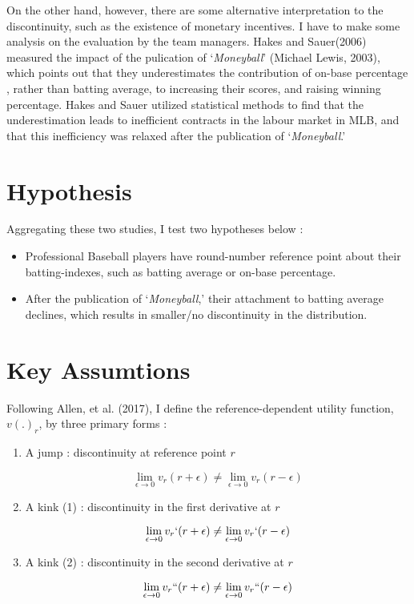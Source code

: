 \documentclass{jsarticle}[12pt]
\begin{document}
\hspace{1zw}On the other hand, however, there are some alternative interpretation to the discontinuity, such as the existence of monetary incentives. I have to make some analysis on the evaluation by the team managers. Hakes and Sauer(2006) measured the impact of the pulication of `\textit{Moneyball}' (Michael Lewis, 2003), which points out that they underestimates the contribution of on-base percentage , rather than batting average, to increasing their scores, and raising winning percentage.  Hakes and Sauer utilized statistical methods to find that the underestimation leads to inefficient contracts in the labour market in MLB, and that this inefficiency was relaxed after the publication of `\textit{Moneyball}.'

\section{Hypothesis}

\hspace{1zw}Aggregating these two studies, I test two hypotheses below :

 \begin{itemize}
 
 \item Professional Baseball players have round-number reference point about their batting-indexes, such as batting average or on-base percentage.
 
 \item After the publication of `\textit{Moneyball},' their attachment to batting average declines, which results in smaller/no discontinuity in the distribution.
 
 \end{itemize}

\section{Key Assumtions}

\hspace{1zw} Following Allen, et al. (2017), I define the reference-dependent utility function, $v(.)_r$, by three primary forms :

 \begin{enumerate}
 
 \item A jump : discontinuity at reference point $r$
 
 \[ \lim_{\epsilon \to 0} v_r (r+ \epsilon) \neq \lim_{\epsilon \to 0} v_r (r -\epsilon) \]
 
 \item A kink (1) : discontinuity in the first derivative at $r$
 
 \[ \lim_{\epsilon \to 0} v_r ` (r+ \epsilon) \neq \lim_{\epsilon \to 0} v_r ` (r -\epsilon) \]
 
 \item A kink (2) : discontinuity in the second derivative at $r$
 
 \[ \lim_{\epsilon \to 0} v_r `` (r+ \epsilon) \neq \lim_{\epsilon \to 0} v_r `` (r -\epsilon) \]
 
 \end{enumerate}
\end{document}
